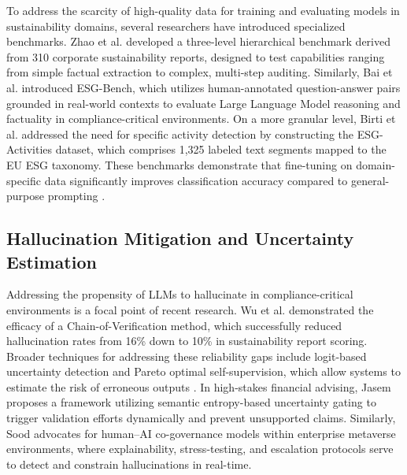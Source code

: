 To address the scarcity of high-quality data for training and evaluating models in sustainability domains, several researchers have introduced specialized benchmarks. Zhao et al.  \parencite{yilei_zhao_b7bbd9c8} developed a three-level hierarchical benchmark derived from 310 corporate sustainability reports, designed to test capabilities ranging from simple factual extraction to complex, multi-step auditing. Similarly, Bai et al.  \parencite{association_for_artificial_intelligence_2026_86e12eae} introduced ESG-Bench, which utilizes human-annotated question-answer pairs grounded in real-world contexts to evaluate Large Language Model reasoning and factuality in compliance-critical environments. On a more granular level, Birti et al.  \parencite{mattia_birti_c097e3e8} addressed the need for specific activity detection by constructing the ESG-Activities dataset, which comprises 1,325 labeled text segments mapped to the EU ESG taxonomy. These benchmarks demonstrate that fine-tuning on domain-specific data significantly improves classification accuracy compared to general-purpose prompting  \parencite{mattia_birti_c097e3e8}.
\subsection{Hallucination Mitigation and Uncertainty Estimation}

Addressing the propensity of LLMs to hallucinate in compliance-critical environments is a focal point of recent research. Wu et al.  \parencite{yue_wu_cae353aa} demonstrated the efficacy of a Chain-of-Verification method, which successfully reduced hallucination rates from 16\% down to 10\% in sustainability report scoring. Broader techniques for addressing these reliability gaps include logit-based uncertainty detection and Pareto optimal self-supervision, which allow systems to estimate the risk of erroneous outputs  \parencite{yue_zhang_9101e661}. In high-stakes financial advising, Jasem  \parencite{al_noor_ali_aziz_jasem_af362154} proposes a framework utilizing semantic entropy-based uncertainty gating to trigger validation efforts dynamically and prevent unsupported claims. Similarly, Sood  \parencite{rohit_sood_cb3a4ead} advocates for human–AI co-governance models within enterprise metaverse environments, where explainability, stress-testing, and escalation protocols serve to detect and constrain hallucinations in real-time.

